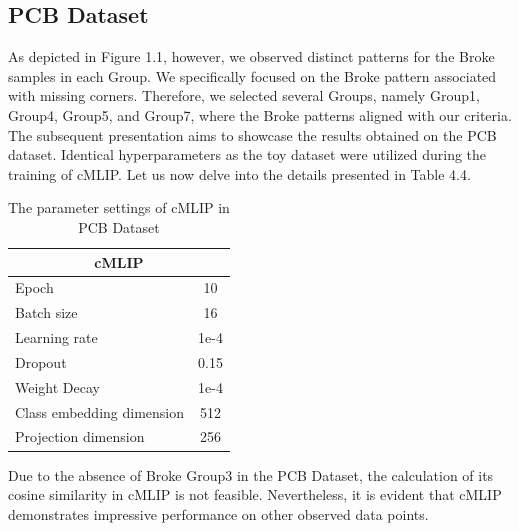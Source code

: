\subsection{PCB Dataset}
As depicted in Figure 1.1, however, we observed distinct patterns for the Broke samples in each Group. We specifically focused on the Broke pattern associated with missing corners. Therefore, we selected several Groups, namely Group1, Group4, Group5, and Group7, where the Broke patterns aligned with our criteria. The subsequent presentation aims to showcase the results obtained on the PCB dataset. Identical hyperparameters as the toy dataset were utilized during the training of cMLIP. Let us now delve into the details presented in Table 4.4.
\begin{table}[H]
    \centering
    \renewcommand{\arraystretch}{1} %
    \begin{tabular}[h]{lc} \hline 
        \multicolumn{2}{c}{cMLIP} \\ \hline
        Epoch & 10\\ 
        Batch size &  16\\ 
        Learning rate & 1e-4\\ 
        Dropout & 0.15\\
        Weight Decay & 1e-4\\
        Class embedding dimension & 512 \\
        Projection dimension & 256 \\ \hline 
    \end{tabular}
    \caption{The parameter settings of cMLIP in PCB Dataset }
    \label{tab:experimental_config}
\end{table}
Due to the absence of Broke Group3 in the PCB Dataset, the calculation of its cosine similarity in cMLIP is not feasible. Nevertheless, it is evident that cMLIP demonstrates impressive performance on other observed data points.
